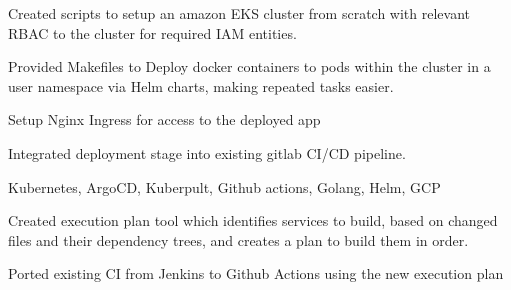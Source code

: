 \documentclass[]{font}
\begin{document}
\begin{minipage}[t]{0.66\textwidth}
\begin{tightemize}
\item Created scripts to setup an amazon EKS cluster from scratch with relevant RBAC to the cluster for required IAM entities.
\item Provided Makefiles to Deploy docker containers to pods within the cluster in a user namespace via Helm charts, making repeated tasks easier.
\item Setup Nginx Ingress for access to the deployed app 
\item Integrated deployment stage into existing gitlab CI/CD pipeline.
\end{tightemize}
\sectionsep


Kubernetes, ArgoCD, Kuberpult, Github actions, Golang, Helm, GCP
\vspace{\topsep}

\begin{tightemize}
\item Created execution plan tool which identifies services to build, based on changed files and their dependency trees, and creates a plan to build them in order. 
\item Ported existing CI from Jenkins to Github Actions using the new execution plan
\end{tightemize}
\sectionsep



\end{minipage}
\end{document}
